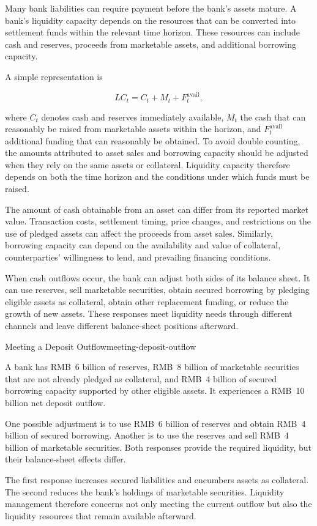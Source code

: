 Many bank liabilities can require payment before the bank's assets mature. A bank's liquidity capacity depends on the resources that can be converted into settlement funds within the relevant time horizon. These resources can include cash and reserves, proceeds from marketable assets, and additional borrowing capacity.

A simple representation is

\begin{equation}
LC_t=C_t+M_t+F_t^{\mathrm{avail}},
\label{eq:ch12-liquidity-capacity}
\end{equation}

where $C_t$ denotes cash and reserves immediately available, $M_t$ the cash that can reasonably be raised from marketable assets within the horizon, and $F_t^{\mathrm{avail}}$ additional funding that can reasonably be obtained. To avoid double counting, the amounts attributed to asset sales and borrowing capacity should be adjusted when they rely on the same assets or collateral. Liquidity capacity therefore depends on both the time horizon and the conditions under which funds must be raised.

The amount of cash obtainable from an asset can differ from its reported market value. Transaction costs, settlement timing, price changes, and restrictions on the use of pledged assets can affect the proceeds from asset sales. Similarly, borrowing capacity can depend on the availability and value of collateral, counterparties' willingness to lend, and prevailing financing conditions.

When cash outflows occur, the bank can adjust both sides of its balance sheet. It can use reserves, sell marketable securities, obtain secured borrowing by pledging eligible assets as collateral, obtain other replacement funding, or reduce the growth of new assets. These responses meet liquidity needs through different channels and leave different balance-sheet positions afterward.

\begin{example}{Meeting a Deposit Outflow}{meeting-deposit-outflow}

A bank has RMB~6 billion of reserves, RMB~8 billion of marketable securities that are not already pledged as collateral, and RMB~4 billion of secured borrowing capacity supported by other eligible assets. It experiences a RMB~10 billion net deposit outflow.

One possible adjustment is to use RMB~6 billion of reserves and obtain RMB~4 billion of secured borrowing. Another is to use the reserves and sell RMB~4 billion of marketable securities. Both responses provide the required liquidity, but their balance-sheet effects differ.

The first response increases secured liabilities and encumbers assets as collateral. The second reduces the bank's holdings of marketable securities. Liquidity management therefore concerns not only meeting the current outflow but also the liquidity resources that remain available afterward.

\end{example}

